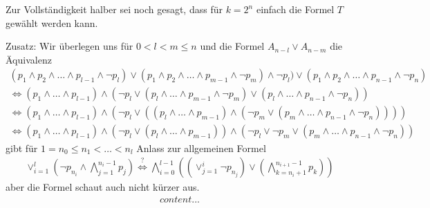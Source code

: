 \begin{solution}
Zur Vollständigkeit halber sei noch gesagt, dass für $k = 2^n$ einfach die Formel $T$ gewählt werden kann.

Zusatz: Wir überlegen uns für $0 < l < m \leq n$ und die Formel $A_{n-l} \lor A_{n-m}$ die Äquivalenz
\begin{align*}
(p_1 \land p_2 \land \dots \land p_{l-1} \land \neg p_l) \lor (p_1 \land p_2 \land \dots \land p_{m-1} \land \neg p_m) \land \neg p_l) \lor (p_1 \land p_2 \land \dots \land p_{n-1} \land \neg p_n) \\
\Leftrightarrow (p_1 \land \dots \land p_{l-1}) \land (\neg p_l \lor (p_l \land \dots \land p_{m-1} \land \neg p_m) \lor (p_l \land \dots \land p_{n-1} \land \neg p_n)) \\
\Leftrightarrow (p_1 \land \dots \land p_{l-1}) \land (\neg p_l \lor ((p_l \land \dots \land p_{m-1}) \land (\neg p_m \lor (p_m \land \dots \land p_{n-1} \land \neg p_n)))) \\
\Leftrightarrow (p_1 \land \dots \land p_{l-1}) \land (\neg p_l \lor (p_l \land \dots \land p_{m-1})) \land (\neg p_l \lor \neg p_m \lor (p_m \land \dots \land p_{n-1} \land \neg p_n))
\end{align*}
gibt für $1 = n_0 \leq n_1 < \dots < n_l$ Anlass zur allgemeinen Formel 
\begin{align*}
\lor_{i=1}^l \left(\neg p_{n_i} \land \bigwedge_{j=1}^{n_i - 1} p_j \right)
\stackrel{?}{\Leftrightarrow} \bigwedge_{i=0}^{l - 1} \left(\left(\lor_{j=1}^i \neg p_{n_j}\right) \lor \left(\bigwedge_{k = n_i + 1}^{n_{i+1} - 1} p_k\right)\right) 
\end{align*}
aber die Formel schaut auch nicht kürzer aus. 
\begin{align*}
content...
\end{align*}
\end{solution}


